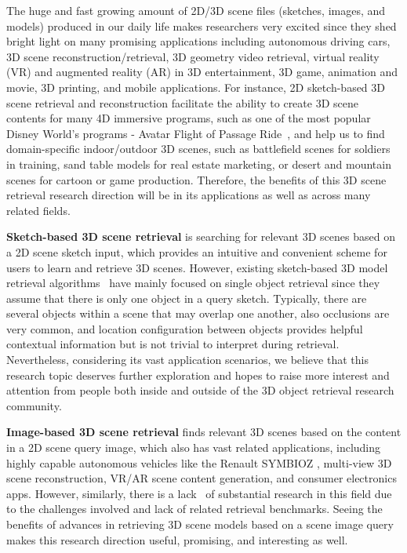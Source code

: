 \documentclass[times, 10pt,twocolumn]{article}
\begin{document}
\label{sec:intro}
The huge and fast growing amount of 2D/3D scene files (sketches, images, and models) produced in our daily life makes researchers very excited since they shed bright light on many promising applications including autonomous driving cars,  3D scene reconstruction/retrieval, 3D geometry video retrieval, virtual reality (VR) and augmented reality (AR) in 3D entertainment, 3D game, animation and movie, 3D printing, and mobile applications. For instance,  2D sketch-based 3D scene retrieval and reconstruction facilitate the ability to create 3D scene contents for many 4D immersive programs, such as one of the most popular Disney World's programs -  Avatar Flight of Passage Ride~\cite{wiki:AvatarFlightofPassage, DisneyWorldAnimalKingdom, Pre-showinPandora}, and help us to find domain-specific indoor/outdoor 3D scenes, such as battlefield scenes for soldiers in training, sand table models for real estate marketing, or desert and mountain scenes for cartoon or game production. Therefore,  the benefits of this 3D scene retrieval research direction will be in its applications as well as across many related fields. 

\textbf{Sketch-based 3D scene retrieval} is searching for relevant 3D scenes based on a 2D scene sketch input, which provides an intuitive and convenient scheme for users to learn and retrieve 3D scenes.  However, existing sketch-based 3D model retrieval algorithms~\cite{DBLP:journals/cviu/LiLLGSABCCFFFLLJKKOTWZZ15} have mainly focused on single object retrieval since they assume that there is only one object in a query sketch. Typically, there are several objects within a scene that may overlap one another, also occlusions are very common, and location configuration between objects provides helpful contextual information but is not trivial to interpret during retrieval. Nevertheless, considering its vast application scenarios, we believe that this research topic deserves further exploration and hopes to raise more interest and attention from people both inside and outside of the 3D object retrieval research community.


\textbf{Image-based 3D scene retrieval} finds relevant 3D scenes based on the content in a 2D scene query image, which also has vast related applications, including highly capable autonomous vehicles like the Renault SYMBIOZ \cite{Renault} \cite{Youtube}, multi-view 3D scene reconstruction, VR/AR scene content generation, and consumer electronics apps. 
However, similarly, there is a lack~\cite{xu2016data} of substantial research in this field due to the challenges involved and lack of related retrieval benchmarks. Seeing the benefits of advances in retrieving 3D scene models based on a scene image query makes this research direction useful, promising, and interesting as well. 
\end{document}
